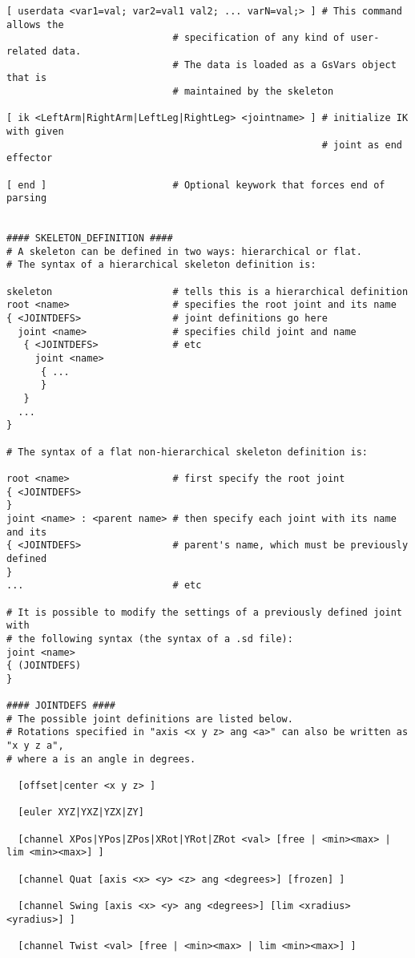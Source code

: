 \begin{lstlisting}[title={}]
[ userdata <var1=val; var2=val1 val2; ... varN=val;> ] # This command allows the
                             # specification of any kind of user-related data.
                             # The data is loaded as a GsVars object that is
                             # maintained by the skeleton

[ ik <LeftArm|RightArm|LeftLeg|RightLeg> <jointname> ] # initialize IK with given
                                                       # joint as end effector

[ end ]                      # Optional keywork that forces end of parsing


#### SKELETON_DEFINITION ####
# A skeleton can be defined in two ways: hierarchical or flat.
# The syntax of a hierarchical skeleton definition is:

skeleton                     # tells this is a hierarchical definition
root <name>                  # specifies the root joint and its name
{ <JOINTDEFS>                # joint definitions go here
  joint <name>               # specifies child joint and name
   { <JOINTDEFS>             # etc
     joint <name>
      { ...
      }
   }
  ...
}

# The syntax of a flat non-hierarchical skeleton definition is:

root <name>                  # first specify the root joint
{ <JOINTDEFS>
}
joint <name> : <parent name> # then specify each joint with its name and its
{ <JOINTDEFS>                # parent's name, which must be previously defined
}
...                          # etc

# It is possible to modify the settings of a previously defined joint with
# the following syntax (the syntax of a .sd file):
joint <name>
{ (JOINTDEFS)
}

#### JOINTDEFS ####
# The possible joint definitions are listed below.
# Rotations specified in "axis <x y z> ang <a>" can also be written as "x y z a",
# where a is an angle in degrees.

  [offset|center <x y z> ]

  [euler XYZ|YXZ|YZX|ZY]

  [channel XPos|YPos|ZPos|XRot|YRot|ZRot <val> [free | <min><max> | lim <min><max>] ]

  [channel Quat [axis <x> <y> <z> ang <degrees>] [frozen] ]

  [channel Swing [axis <x> <y> ang <degrees>] [lim <xradius> <yradius>] ]

  [channel Twist <val> [free | <min><max> | lim <min><max>] ]


\end{lstlisting}
